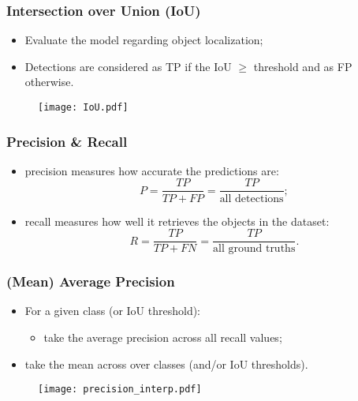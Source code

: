 \documentclass{beamer}
\begin{document}
			\begin{frame}\frametitle{Intersection over Union (IoU)}
				\begin{itemize}
					\item Evaluate the model regarding object localization;
					\item Detections are considered as TP if the IoU $\geq$ threshold and as FP otherwise.
				\end{itemize}
				\begin{figure}[htb]
					\centering
					\texttt{[image: IoU.pdf]}
					\label{fig:IoU}
				\end{figure}

			\end{frame}


			\begin{frame}\frametitle{Precision \& Recall}
				\begin{itemize}
					\item precision measures how accurate the predictions are:
					\begin{equation*}
						P = \frac{TP}{TP + FP} = \frac{TP}{\textrm{all detections}};
						\label{eq:precision}
						\end{equation*}
					\item recall measures how well it retrieves the objects in the dataset:
					\begin{equation*}
						R = \frac{TP}{TP + FN} = \frac{TP}{\textrm{all ground truths}}.
						\label{eq:recall}
						\end{equation*}
				\end{itemize}
			\end{frame}


			\begin{frame}\frametitle{(Mean) Average Precision}
				\begin{itemize}
					\item For a given class (or IoU threshold):
				\begin{itemize}
					\item take the average precision across all recall values;
				\end{itemize}
				\item take the mean across over classes (and/or IoU thresholds).
				\end{itemize}
				\begin{figure}[bh!]
					\centering
					\texttt{[image: precision\_interp.pdf]}
					\label{fig:prec-rec_curve_interp}
				\end{figure}
			\end{frame}
\end{document}
